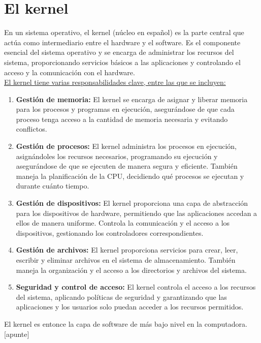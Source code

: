 \documentclass[../main.tex]{subfiles}
\begin{document}
\section{El kernel}
    En un sistema operativo, el kernel (núcleo en español) es la parte central que actúa como intermediario entre el hardware y el software. Es el componente esencial del sistema operativo y se encarga de administrar los recursos del sistema, proporcionando servicios básicos a las aplicaciones y controlando el acceso y la comunicación con el hardware.\\

    \underline{El kernel tiene varias responsabilidades clave, entre las que se incluyen:}
    \begin{enumerate}
        \item \textbf{Gestión de memoria:} El kernel se encarga de asignar y liberar memoria para los procesos y programas en ejecución, asegurándose de que cada proceso tenga acceso a la cantidad de memoria necesaria y evitando conflictos.
        \item \textbf{Gestión de procesos:} El kernel administra los procesos en ejecución, asignándoles los recursos necesarios, programando su ejecución y asegurándose de que se ejecuten de manera segura y eficiente. También maneja la planificación de la CPU, decidiendo qué procesos se ejecutan y durante cuánto tiempo.
        \item \textbf{Gestión de dispositivos:} El kernel proporciona una capa de abstracción para los dispositivos de hardware, permitiendo que las aplicaciones accedan a ellos de manera uniforme. Controla la comunicación y el acceso a los dispositivos, gestionando los controladores correspondientes.
        \item \textbf{Gestión de archivos:} El kernel proporciona servicios para crear, leer, escribir y eliminar archivos en el sistema de almacenamiento. También maneja la organización y el acceso a los directorios y archivos del sistema.
        \item \textbf{Seguridad y control de acceso:} El kernel controla el acceso a los recursos del sistema, aplicando políticas de seguridad y garantizando que las aplicaciones y los usuarios solo puedan acceder a los recursos permitidos.
    \end{enumerate}

    El kernel es entonce la capa de software de más bajo nivel en la computadora.[apunte]
\end{document}
